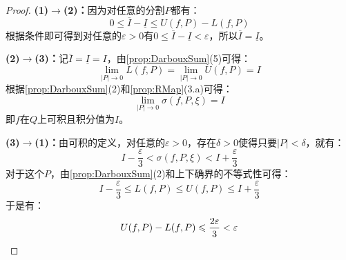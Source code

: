 \begin{proof}
	\textbf{(1)$\to$(2)：}因为对任意的分割$P$都有：
	\begin{equation*}
		0\leqslant\overline{I}-\underline{I}\leqslant U(f,P)-L(f,P)
	\end{equation*}
	根据条件即可得到对任意的$\varepsilon>0$有$0\leqslant\overline{I}-\underline{I}<\varepsilon$，所以$\overline{I}=\underline{I}$。\par
	\textbf{(2)$\to$(3)：}记$\overline{I}=\underline{I}=I$，由\cref{prop:DarbouxSum}(5)可得：
	\begin{equation*}
		\lim_{|P|\to0}L(f,P)=\lim_{|P|\to0}U(f,P)=I
	\end{equation*}
	根据\cref{prop:DarbouxSum}(2)和\cref{prop:RMap}(3.a)可得：
	\begin{equation*}
		\lim_{|P|\to0}\sigma(f,P,\xi)=I
	\end{equation*}
	即$f$在$Q$上可积且积分值为$I$。\par
	\textbf{(3)$\to$(1)：}由可积的定义，对任意的$\varepsilon>0$，存在$\delta>0$使得只要$|P|<\delta$，就有：
	\begin{equation*}
		I-\frac{\varepsilon}{3}<\sigma(f,P,\xi)<I+\frac{\varepsilon}{3}
	\end{equation*}
	对于这个$P$，由\cref{prop:DarbouxSum}(2)和上下确界的不等式性可得：
	\begin{equation*}
		I-\frac{\varepsilon}{3}\leqslant L(f,P)\leqslant U(f,P)\leqslant I+\frac{\varepsilon}{3}
	\end{equation*}
	于是有：
	\begin{equation*}
		U(f,P)-L(f,P)\leqslant\frac{2\varepsilon}{3}<\varepsilon\qedhere
	\end{equation*}
\end{proof}

